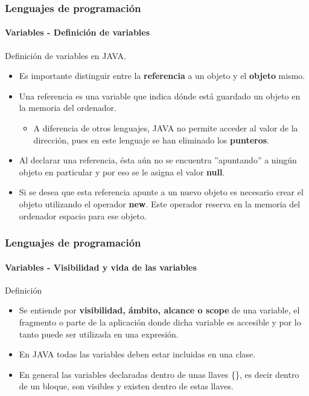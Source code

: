 \documentclass{beamer}
\begin{document}
		\begin{frame}
			\frametitle{Lenguajes de programaci\'on} 
			\framesubtitle{Variables - Definici\'on de variables}

			Definici\'on de variables en JAVA.

			\begin{itemize}
				\item Es importante distinguir entre la \textbf{referencia} a un objeto y el \textbf{objeto} mismo.
				\item Una referencia es una variable que indica d\'onde est\'a guardado un objeto en la memoria del ordenador.
				\begin{itemize}
					\item A diferencia de otros lenguajes, JAVA no permite acceder al valor de la direcci\'on, pues en este lenguaje se han eliminado los \textbf{punteros}.
				\end{itemize}
				\item Al declarar una referencia, \'esta a\'un no se encuentra ''apuntando'' a ning\'un objeto en particular y por eso se le asigna el valor \textbf{null}.
				\item Si se desea que esta referencia apunte a un nuevo objeto es necesario crear el objeto utilizando el operador \textbf{new}. Este operador reserva en la memoria del ordenador espacio para ese objeto. 
			\end{itemize}
		\end{frame}

		\begin{frame}
			\frametitle{Lenguajes de programaci\'on} 
			\framesubtitle{Variables - Visibilidad y vida de las variables}

			\begin{block}{Definici\'on}
				\begin{itemize}
					\item Se entiende por \textbf{visibilidad, \'ambito, alcance o scope} de una variable, el fragmento o parte de la aplicaci\'on donde dicha variable es accesible y por lo tanto puede ser utilizada en una expresi\'on.
					\item En JAVA todas las variables deben estar incluidas en una clase.
					\item En general las variables declaradas dentro de unas llaves \{\}, es decir dentro de un bloque, son visibles y existen dentro de estas llaves. 
				\end{itemize}
			\end{block}
		\end{frame}
\end{document}
